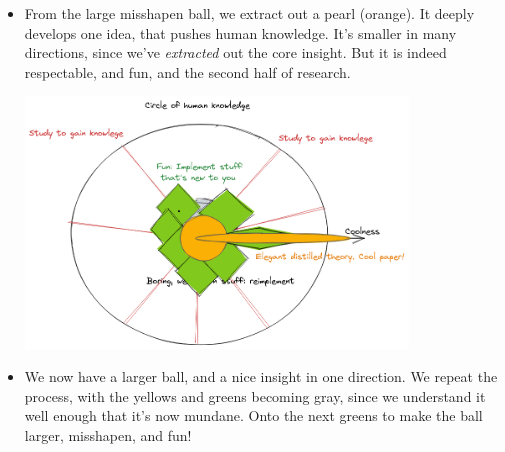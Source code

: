 \documentclass{article}
\begin{document}
\begin{itemize}
\item From the large misshapen ball, we extract out a pearl (orange). It deeply
  develops one idea, that pushes human knowledge. It's smaller in many directions, since
  we've \emph{extracted} out the core insight. But it is indeed respectable, and fun, and the second
  half of research.

\includegraphics[width=0.8\textwidth]{./images/research-6.png}

\item We now have a larger ball, and a nice insight in one direction. We repeat the process, with the yellows and greens becoming gray,
  since we understand it well enough that it's now mundane. Onto the next greens to make the ball larger, misshapen, and fun!

\end{itemize}
\end{document}
